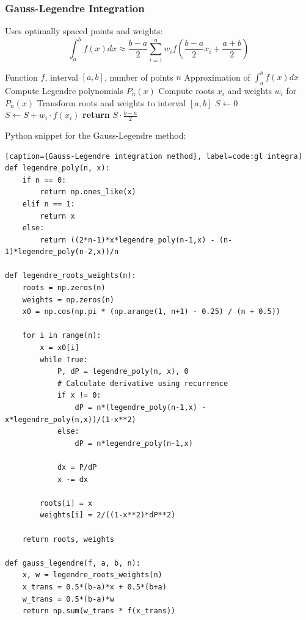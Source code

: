 \documentclass[10pt]{article}
\begin{document}
\subsubsection{Gauss-Legendre Integration}

Uses optimally spaced points and weights:
\begin{equation}
\int_{a}^{b} f(x)dx \approx \frac{b-a}{2}\sum_{i=1}^{n} w_i f\left(\frac{b-a}{2}x_i + \frac{a+b}{2}\right)
\end{equation}

\begin{algorithm}[H]
\caption{Gauss-Legendre Integration}
\begin{algorithmic}[1]
\Require Function $f$, interval $[a, b]$, number of points $n$
\Ensure Approximation of $\int_{a}^{b} f(x) dx$
\State Compute Legendre polynomials $P_n(x)$
\State Compute roots $x_i$ and weights $w_i$ for $P_n(x)$
\State Transform roots and weights to interval $[a, b]$
\State $S \gets 0$
    \State $S \gets S + w_i \cdot f(x_i)$
\EndFor
\State \textbf{return} $S \cdot \frac{b-a}{2}$
\end{algorithmic}
\end{algorithm}

Python snippet for the Gauss-Legendre method:
\begin{lstlisting}[style=custompython][caption={Gauss-Legendre integration method}, label=code:gl integra]
def legendre_poly(n, x):
    if n == 0:
        return np.ones_like(x)
    elif n == 1:
        return x
    else:
        return ((2*n-1)*x*legendre_poly(n-1,x) - (n-1)*legendre_poly(n-2,x))/n

def legendre_roots_weights(n):
    roots = np.zeros(n)
    weights = np.zeros(n)
    x0 = np.cos(np.pi * (np.arange(1, n+1) - 0.25) / (n + 0.5))
    
    for i in range(n):
        x = x0[i]
        while True:
            P, dP = legendre_poly(n, x), 0
            # Calculate derivative using recurrence
            if x != 0:
                dP = n*(legendre_poly(n-1,x) - x*legendre_poly(n,x))/(1-x**2)
            else:
                dP = n*legendre_poly(n-1,x)
            
            dx = P/dP
            x -= dx
        
        roots[i] = x
        weights[i] = 2/((1-x**2)*dP**2)
    
    return roots, weights

def gauss_legendre(f, a, b, n):
    x, w = legendre_roots_weights(n)
    x_trans = 0.5*(b-a)*x + 0.5*(b+a)
    w_trans = 0.5*(b-a)*w
    return np.sum(w_trans * f(x_trans))
    
\end{lstlisting}
\end{document}

